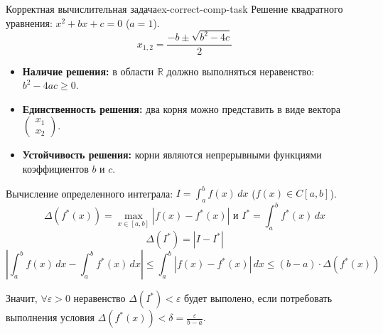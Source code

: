 \documentclass[14pt]{extarticle}
\begin{document}
    \begin{example}{Корректная вычислительная задача}{ex-correct-comp-task}
        Решение квадратного уравнения: $x^{2} + bx + c = 0$ ($a = 1$).
        $$x_{1, 2} = \frac{-b \pm \sqrt{b^{2} - 4c}}{2}$$
        \begin{itemize}
            \item \textbf{Наличие решения:} в области $\mathbb{R}$ должно выполняться неравенство: $b^{2} - 4ac \geq 0$.
            \item \textbf{Единственность решения:} два корня можно представить в виде вектора $\begin{pmatrix} x_{1} \\ x_{2} \end{pmatrix}$.
            \item \textbf{Устойчивость решения:} корни являются непрерывными функциями коэффициентов $b$ и $c$.
        \end{itemize}

        \vspace{\baselineskip}

        Вычисление определенного интеграла: $I = \int_{a}^{b} f(x) \, dx$ ($f(x) \in C[a, b]$).\\
        $$ \Delta(f^{*}(x)) = \max_{x \in [a, b]}|f(x) - f^{*}(x)| \text{ и } I^{*} = \int_{a}^{b} f^{*}(x) \, dx$$
        $$\Delta(I^{*}) = |I - I^{*}|$$ 
        $$|\int_{a}^{b} f(x) \, dx - \int_{a}^{b} f^{*}(x) \, dx| \leq \int_{a}^{b} |f(x) - f^{*}(x)| \, dx \leq (b - a) \cdot \Delta(f^{*}(x))$$

        \vspace{\baselineskip}

        Значит, $\forall \varepsilon > 0$ неравенство $\Delta(I^{*}) < \varepsilon$ будет выполено, если потребовать выполнения условия $\Delta(f^{*}(x)) < \delta = \frac{\varepsilon}{b - a}$.
    \end{example}
\end{document}
